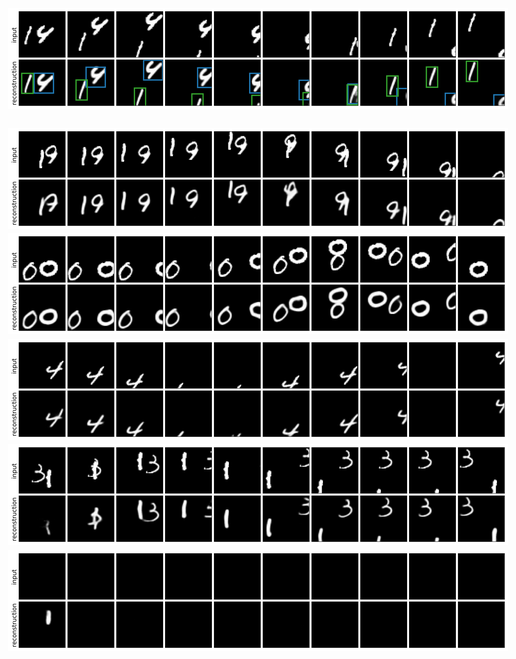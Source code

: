 \begin{center}
    \includegraphics[width=\linewidth]{figures/SQAIR/mnist_rec/000098.png} 
    \label{fig:mnist_recs_additional}
\end{center}




\begin{center}
    \includegraphics[width=\linewidth]{figures/SQAIR/vrnn_rec/000009.png}
    \includegraphics[width=\linewidth]{figures/SQAIR/vrnn_rec/000015.png}
    \includegraphics[width=\linewidth]{figures/SQAIR/vrnn_rec/000018.png}
    \includegraphics[width=\linewidth]{figures/SQAIR/vrnn_rec/000038.png}
    \includegraphics[width=\linewidth]{figures/SQAIR/vrnn_rec/000041.png}

\end{center}
